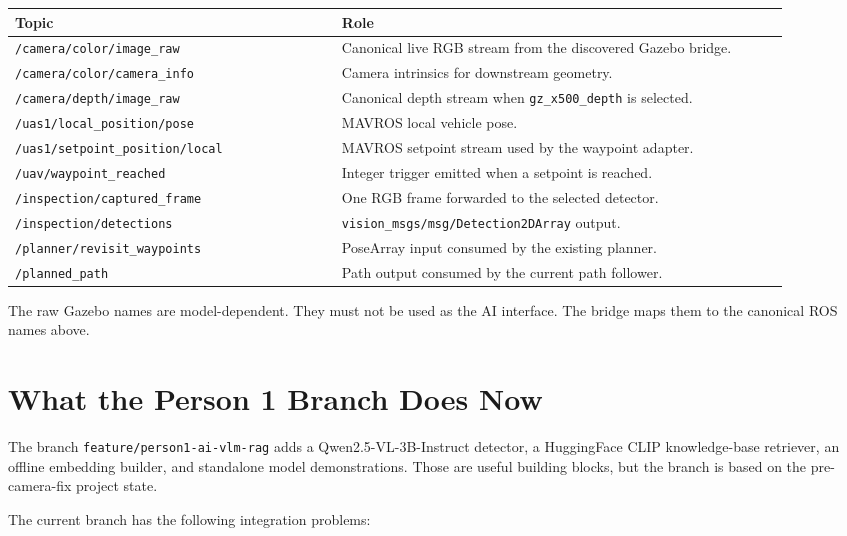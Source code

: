\documentclass[11pt,a4paper]{article}
\newcommand{\code}[1]{\texttt{\small #1}}
\begin{document}
\begin{longtable}{p{0.38\linewidth}p{0.52\linewidth}}
\toprule
\textbf{Topic} & \textbf{Role} \\
\midrule
\code{/camera/color/image\_raw} & Canonical live RGB stream from the discovered Gazebo bridge. \\
\code{/camera/color/camera\_info} & Camera intrinsics for downstream geometry. \\
\code{/camera/depth/image\_raw} & Canonical depth stream when \code{gz\_x500\_depth} is selected. \\
\code{/uas1/local\_position/pose} & MAVROS local vehicle pose. \\
\code{/uas1/setpoint\_position/local} & MAVROS setpoint stream used by the waypoint adapter. \\
\code{/uav/waypoint\_reached} & Integer trigger emitted when a setpoint is reached. \\
\code{/inspection/captured\_frame} & One RGB frame forwarded to the selected detector. \\
\code{/inspection/detections} & \code{vision\_msgs/msg/Detection2DArray} output. \\
\code{/planner/revisit\_waypoints} & PoseArray input consumed by the existing planner. \\
\code{/planned\_path} & Path output consumed by the current path follower. \\
\bottomrule
\end{longtable}

The raw Gazebo names are model-dependent. They must not be used as the AI
interface. The bridge maps them to the canonical ROS names above.

\section{What the Person 1 Branch Does Now}

The branch \code{feature/person1-ai-vlm-rag} adds a Qwen2.5-VL-3B-Instruct
detector, a HuggingFace CLIP knowledge-base retriever, an offline embedding
builder, and standalone model demonstrations. Those are useful building
blocks, but the branch is based on the pre-camera-fix project state.

The current branch has the following integration problems:
\end{document}
